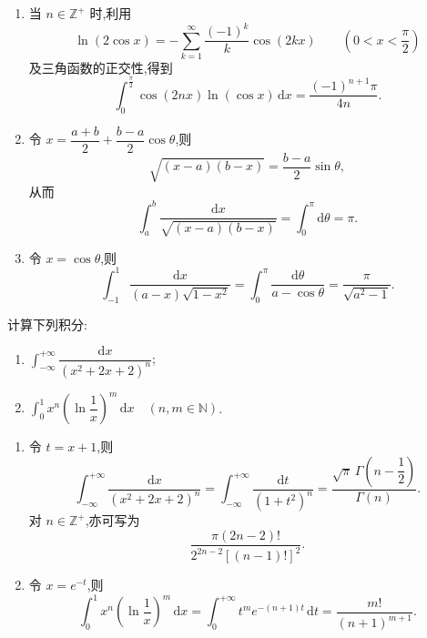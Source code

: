 \begin{solution}
  \begin{enumerate}
    \item 当 $n\in\mathbb{Z}^+$ 时,利用
          \[
            \ln(2\cos x)=-\sum\limits_{k=1}^{\infty}\dfrac{(-1)^k}{k}\cos(2kx)
            \qquad\left(0<x<\dfrac{\pi}{2}\right)
          \]
          及三角函数的正交性,得到
          \[
            \int_0^{\frac{\pi}{2}}\cos(2nx)\ln(\cos x)\,\mathrm{d}x
            =\dfrac{(-1)^{n+1}\pi}{4n}.
          \]

    \item 令 $x=\dfrac{a+b}{2}+\dfrac{b-a}{2}\cos\theta$,则
          \[
            \sqrt{(x-a)(b-x)}=\dfrac{b-a}{2}\sin\theta,
          \]
          从而
          \[
            \int_a^b\dfrac{\mathrm{d}x}{\sqrt{(x-a)(b-x)}}
            =\int_0^\pi\mathrm{d}\theta=\pi.
          \]

    \item 令 $x=\cos\theta$,则
          \[
            \int_{-1}^{1}\dfrac{\mathrm{d}x}{(a-x)\sqrt{1-x^2}}
            =\int_0^\pi\dfrac{\mathrm{d}\theta}{a-\cos\theta}
            =\dfrac{\pi}{\sqrt{a^2-1}}.
          \]
  \end{enumerate}
\end{solution}

\begin{example}
  计算下列积分:
  \begin{enumerate}
    \item $\displaystyle\int_{-\infty}^{+\infty}\dfrac{\mathrm{d}x}{(x^2+2x+2)^n}$;
    \item $\displaystyle\int_0^1x^n\left(\ln\dfrac{1}{x}\right)^m\,\mathrm{d}x\quad(n,m\in\mathbb{N})$.
  \end{enumerate}
\end{example}
\exampleblank

\begin{solution}
  \begin{enumerate}
    \item 令 $t=x+1$,则
          \[
            \int_{-\infty}^{+\infty}\dfrac{\mathrm{d}x}{(x^2+2x+2)^n}
            =\int_{-\infty}^{+\infty}\dfrac{\mathrm{d}t}{(1+t^2)^n}
            =\dfrac{\sqrt{\pi}\,\Gamma\left(n-\dfrac{1}{2}\right)}{\Gamma(n)}.
          \]
          对 $n\in\mathbb{Z}^+$,亦可写为
          \[
            \dfrac{\pi(2n-2)!}{2^{2n-2}[(n-1)!]^2}.
          \]

    \item 令 $x=e^{-t}$,则
          \[
            \int_0^1x^n\left(\ln\dfrac{1}{x}\right)^m\,\mathrm{d}x
            =\int_0^{+\infty}t^m e^{-(n+1)t}\,\mathrm{d}t
            =\dfrac{m!}{(n+1)^{m+1}}.
          \]
  \end{enumerate}
\end{solution}

